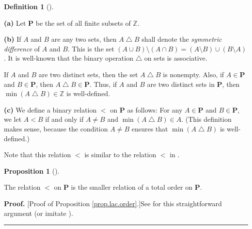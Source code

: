 \documentclass[numbers=enddot,12pt,final,onecolumn,notitlepage]{scrartcl}%
\theoremstyle{definition}
\newtheorem{prop}[theo]{Proposition}
\newenvironment{proposition}[1][]
{\begin{prop}[#1]\begin{leftbar}}
{\end{leftbar}\end{prop}}
\newtheorem{defi}[theo]{Definition}
\newenvironment{definition}[1][]
{\begin{defi}[#1]\begin{leftbar}}
{\end{leftbar}\end{defi}}
\newenvironment{proof}[1][Proof]{\noindent\textbf{#1.} }{\ \rule{0.5em}{0.5em}}
\newenvironment{vershort}{}{}
\begin{document}
\begin{definition}
\label{def.order-on-P}
\textbf{(a)} Let $\mathbf{P}$ be the set of all finite subsets of $\mathbb{Z}$.

\textbf{(b)} If $A$ and $B$ are any two sets, then $A\bigtriangleup B$ shall
denote the \textit{symmetric difference} of $A$ and $B$. This is the set
$\left(  A\cup B\right)  \setminus\left(  A\cap B\right)  =\left(  A\setminus
B\right)  \cup\left(  B\setminus A\right)  $. It is well-known that the binary
operation $\bigtriangleup$ on sets is associative.

If $A$ and $B$ are two
distinct sets, then the set $A\bigtriangleup B$ is nonempty. Also, if
$A\in\mathbf{P}$ and $B\in\mathbf{P}$, then $A\bigtriangleup B\in\mathbf{P}$.
Thus, if $A$ and $B$ are two distinct sets in $\mathbf{P}$, then $\min\left(
A\bigtriangleup B\right)  \in\mathbb{Z}$ is well-defined.

\textbf{(c)} We define a binary relation $<$ on $\mathbf{P}$ as follows: For
any $A\in\mathbf{P}$ and $B\in\mathbf{P}$, we let $A<B$ if and only if $A\neq
B$ and $\min\left(  A\bigtriangleup B\right)  \in A$. (This definition makes
sense, because the condition $A\neq B$ ensures that $\min\left(
A\bigtriangleup B\right)  $ is well-defined.)
\end{definition}

Note that this relation $<$ is similar to the relation $<$ in \cite[Lemma
4.3]{ABN-peaks}.

\begin{proposition}
\label{prop.lac.order}The relation $<$ on $\mathbf{P}$ is the smaller relation
of a total order on $\mathbf{P}$.
\end{proposition}

\begin{vershort}


\begin{proof}
[Proof of Proposition \ref{prop.lac.order}.]See \cite{verlong} for this
straightforward argument (or imitate \cite[proof of Lemma 4.3]{ABN-peaks}).
\end{proof}
\end{vershort}
\end{document}
